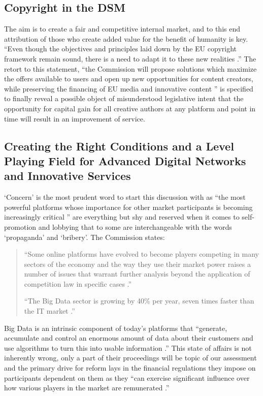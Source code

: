\documentclass[a4paper]{article}
\begin{document}
\subsection{Copyright in the DSM} %

The aim is to create a fair and competitive internal market, and to this end attribution of those who create added value for the benefit of humanity is key. \\

\noindent
``Even though the objectives and principles laid down by the EU copyright framework remain sound, there is a need to adapt it to these new realities \cite{DSM}.'' The retort to this statement, ``the Commission will propose solutions which maximize the offers available to users and open up new opportunities for content creators, while preserving the financing of EU media and innovative content \cite{DSM}'' is specified to finally reveal a possible object of misunderstood legislative intent that the opportunity for capital gain for all creative authors at any platform and point in time will result in an improvement of service.

\subsection{Creating the Right Conditions and a Level Playing Field for Advanced Digital Networks and Innovative Services}

`Concern' is the most prudent word to start this discussion with as ``the most powerful platforms whose importance for other market participants is becoming increasingly critical \cite{DSM}'' are everything but shy and reserved when it comes to self-promotion and lobbying that to some are interchangeable with the words `propaganda' and `bribery'. The Commission states: \\
\begin{quote}
``Some online platforms have evolved to become players competing in many sectors of the economy and the way they use their market power raises a number of issues that warrant further analysis beyond the application of competition law in specific cases \cite{DSM}.'' 

``The Big Data sector is growing by 40\% per year, seven times faster than the IT market \cite{DSM}.''\\
\end{quote}

\noindent
Big Data is an intrinsic component of today's platforms that ``generate, accumulate and control an enormous amount of data about their customers and use algorithms to turn this into usable information \cite{DSM}.'' This state of affairs is not inherently wrong, only a part of their proceedings will be topic of our assessment and the primary drive for reform lays in the financial regulations they impose on participants dependent on them as they ``can exercise  significant  influence over how various players in the market are remunerated \cite{DSM}.'' 
\end{document}
